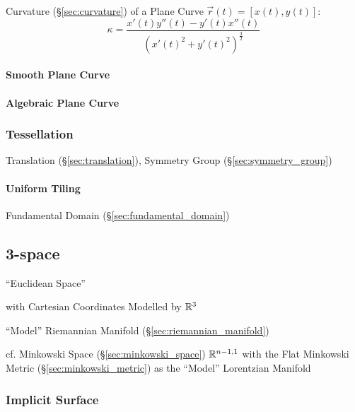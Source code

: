 Curvature (\S\ref{sec:curvature}) of a Plane Curve $\vec{r}(t) = [x(t),y(t)]$:
\[
  \kappa = \frac{x'(t)y''(t) - y'(t)x''(t)} {(x'(t)^2 + y'(t)^2)^{\frac{3}{2}}}
\]


\paragraph{Smooth Plane Curve}\label{sec:smooth_plane_curve}\hfill

\paragraph{Algebraic Plane Curve}\label{sec:algebraic_plane_curve}\hfill



\subsubsection{Tessellation}\label{sec:tessellation}

\fist Translation (\S\ref{sec:translation}), Symmetry Group
(\S\ref{sec:symmetry_group})



\paragraph{Uniform Tiling}\label{sec:uniform_tiling}\hfill

Fundamental Domain (\S\ref{sec:fundamental_domain})



\subsection{3-space}\label{sec:3_space}

``Euclidean Space''

with Cartesian Coordinates Modelled by $\mathbb{R}^3$

``Model'' Riemannian Manifold (\S\ref{sec:riemannian_manifold})

cf. Minkowski Space (\S\ref{sec:minkowski_space}) $\mathbb{R}^{n-1,1}$
with the Flat Minkowski Metric (\S\ref{sec:minkowski_metric}) as the
``Model'' Lorentzian Manifold



\subsubsection{Implicit Surface}\label{sec:implicit_surface}

